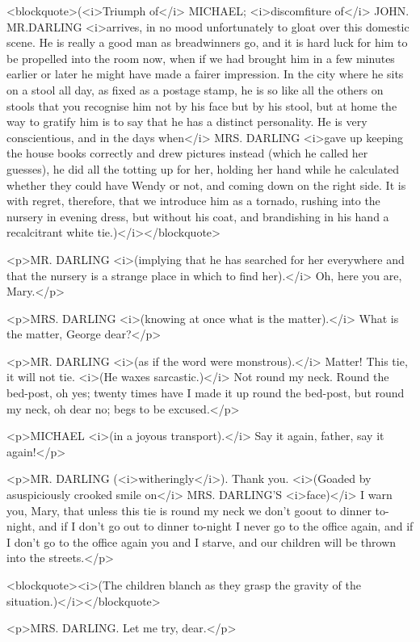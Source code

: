 <blockquote>(<i>Triumph of</i> MICHAEL; <i>discomfiture of</i> JOHN. MR.DARLING <i>arrives, in no mood unfortunately to gloat over this domestic scene. He is really a good man as breadwinners go, and it is hard luck for him to be propelled into the room now, when if we had brought him in a few minutes earlier or later he might have made a fairer impression. In the city where he sits on a stool all day, as fixed as a postage stamp, he is so like all the others on stools that you recognise him not by his face but by his stool, but at home the way to gratify him is to say that he has a distinct personality. He is very conscientious, and in the days when</i> MRS. DARLING <i>gave up keeping the house books correctly and drew pictures instead (which he called her guesses), he did all the totting up for her, holding her hand while he calculated whether they could have Wendy or not, and coming down on the right side. It is with regret, therefore, that we introduce him as a tornado, rushing into the nursery in evening dress, but without his coat, and brandishing in his hand a recalcitrant white tie.)</i></blockquote>

<p>MR. DARLING <i>(implying that he has searched for her everywhere and that the nursery is a strange place in which to find her).</i> Oh, here you are, Mary.</p>

<p>MRS. DARLING <i>(knowing at once what is the matter).</i> What is the matter, George dear?</p>

<p>MR. DARLING <i>(as if the word were monstrous).</i> Matter! This tie, it will not tie. <i>(He waxes sarcastic.)</i> Not round my neck. Round the bed-post, oh yes; twenty times have I made it up round the bed-post, but round my neck, oh dear no; begs to be excused.</p>

<p>MICHAEL <i>(in a joyous transport).</i> Say it again, father, say it again!</p>

<p>MR. DARLING (<i>witheringly</i>). Thank you. <i>(Goaded by asuspiciously crooked smile on</i> MRS. DARLING'S <i>face)</i> I warn you, Mary, that unless this tie is round my neck we don't goout to dinner to-night, and if I don't go out to dinner to-night I never go to the office again, and if I don't go to the office again you and I starve, and our children will be thrown into the streets.</p>

<blockquote><i>(The children blanch as they grasp the gravity of the situation.)</i></blockquote>

<p>MRS. DARLING. Let me try, dear.</p>

